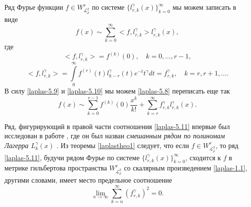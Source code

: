 %

Ряд Фурье функции $f\in W^r_{\mathcal{ L}^2_\rho}$ по системе $\{l_{r,k}^{\gamma}(x)\}_{k=0}^\infty$
мы можем записать в виде
\begin{equation}\label{laplas-5.8}
f(x)\sim  \sum_{k=0}^\infty <f,l_{r,k}^\gamma>  l_{r,k}^\gamma(x),
     \end{equation}
где
\begin{equation}\label{laplas-5.9}
<f,l_{r,k}^\gamma>=f^{(k)}(0),\quad k=0,\ldots, r-1,
     \end{equation}
\begin{equation}\label{laplas-5.10}
<f,l_{r,k}^\gamma>=\int\limits_0^\infty f^{(r)}(t) l_{k-r}^\gamma(t)e^{-t}t^\gamma dt=f_{r,k}^\gamma,\quad k=r,r+1,\ldots.
     \end{equation}
В силу \eqref{laplas-5.9}  и \eqref{laplas-5.10} мы можем \eqref{laplas-5.8} переписать еще так
\begin{equation}\label{laplas-5.11}
f(x)\sim \sum_{k=0}^{r-1} f^{(k)}(0)\frac{x^k}{k!}+ \sum_{k=r}^\infty f_{r,k}^\gamma l_{r,k}^\gamma(x).
\end{equation}

Ряд, фигурирующий в правой части соотношения \eqref{laplas-5.11} впервые был исследован в работе \cite{laplas-Shar13}, где он был назван \textit{ смешанным рядом по полиномам Лагерра $L_{k}^\gamma(x)$ }. Из теоремы \ref{laplastheo1} следует, что если $f\in W^r_{\mathcal{ L}^2_\rho}$, то ряд \eqref{laplas-5.11}, будучи  рядом Фурье  по системе $\{l_{r,k}^{\gamma}(x)\}_{k=0}^\infty$, сходится к $f$ в метрике гильбертова пространства $W^r_{\mathcal{ L}^2_\rho}$ со скалярным произведением \eqref{laplas-1.1}, другими словами, имеет место предельное соотношение
 \begin{equation*}
 \lim_{n\to\infty}\sum_{k=n}^\infty (f_{r,k}^\gamma)^2= 0 .
\end{equation*}


